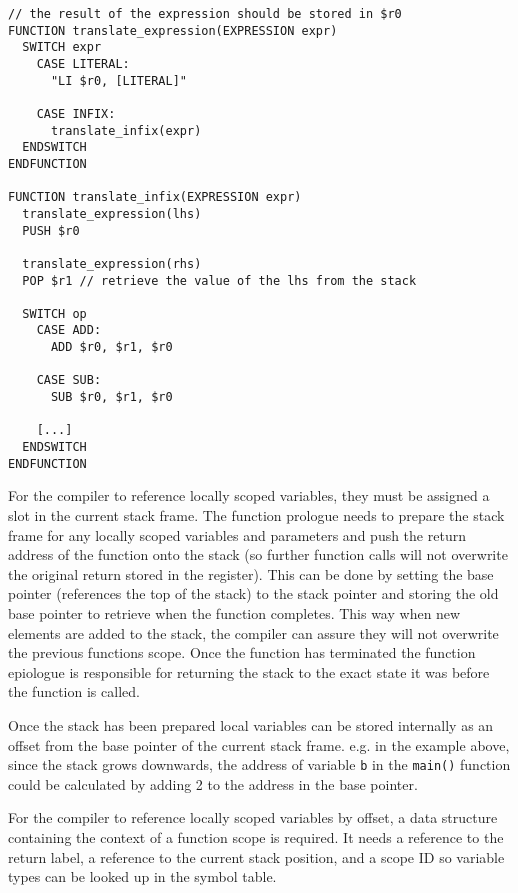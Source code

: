 \begin{lstlisting}
// the result of the expression should be stored in $r0
FUNCTION translate_expression(EXPRESSION expr) 
  SWITCH expr 
    CASE LITERAL:
      "LI $r0, [LITERAL]"

    CASE INFIX:
      translate_infix(expr)
  ENDSWITCH
ENDFUNCTION

FUNCTION translate_infix(EXPRESSION expr) 
  translate_expression(lhs)
  PUSH $r0

  translate_expression(rhs)
  POP $r1 // retrieve the value of the lhs from the stack

  SWITCH op 
    CASE ADD:
      ADD $r0, $r1, $r0

    CASE SUB:
      SUB $r0, $r1, $r0 

    [...]
  ENDSWITCH
ENDFUNCTION
\end{lstlisting}

For the compiler to reference locally scoped variables, they must be assigned a slot in the current stack frame. The function prologue needs to prepare the stack frame for any locally scoped variables and parameters and push the return address of the function onto the stack (so further function calls will not overwrite the original return stored in the register). This can be done by setting the base pointer (references the top of the stack) to the stack pointer and storing the old base pointer to retrieve when the function completes. This way when new elements are added to the stack, the compiler can assure they will not overwrite the previous functions scope. Once the function has terminated the function epiologue is responsible for returning the stack to the exact state it was before the function is called.

\begin{center}
\end{center}

Once the stack has been prepared local variables can be stored internally as an offset from the base pointer of the current stack frame. e.g. in the example above, since the stack grows downwards, the address of variable \texttt{b} in the \texttt{main()} function could be calculated by adding 2 to the address in the base pointer.

For the compiler to reference locally scoped variables by offset, a data structure containing the context of a function scope is required. It needs a reference to the return label, a reference to the current stack position, and a scope ID so variable types can be looked up in the symbol table.

